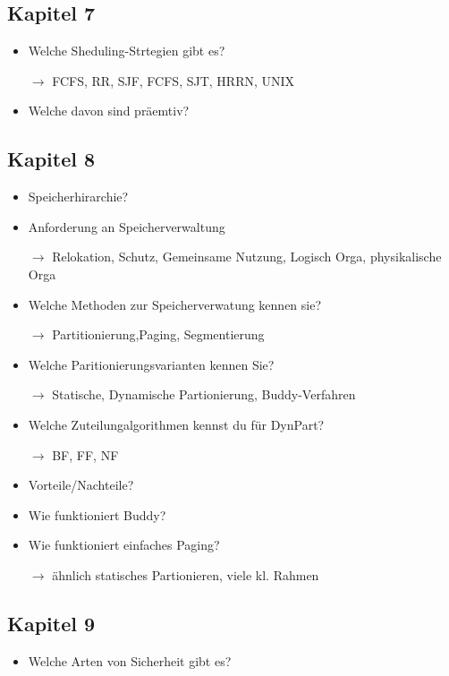 \documentclass[10pt,a4paper]{article}
\begin{document}
\subsection*{Kapitel 7}

\begin{itemize}
\item Welche Sheduling-Strtegien gibt es?
\item[$\rightarrow$] FCFS, RR, SJF, FCFS, SJT, HRRN, UNIX
\item Welche davon sind präemtiv?
\end{itemize}

\subsection*{Kapitel 8}

\begin{itemize}
\item Speicherhirarchie?
\item Anforderung an Speicherverwaltung
\item[$\rightarrow$] Relokation, Schutz, Gemeinsame Nutzung, Logisch Orga, physikalische Orga
\item Welche Methoden zur Speicherverwatung kennen sie?
\item[$\rightarrow$] Partitionierung,Paging, Segmentierung
\item Welche Paritionierungsvarianten kennen Sie?
\item[$\rightarrow$] Statische, Dynamische Partionierung, Buddy-Verfahren
\item Welche Zuteilungalgorithmen kennst du für DynPart?
\item[$\rightarrow$] BF, FF, NF
\item Vorteile/Nachteile?
\item Wie funktioniert Buddy?
\item Wie funktioniert einfaches Paging?
\item[$\rightarrow$] ähnlich statisches Partionieren, viele kl. Rahmen
\end{itemize}

\subsection*{Kapitel 9}

\begin{itemize}
\item Welche Arten von Sicherheit gibt es?
\end{itemize}
\end{document}
